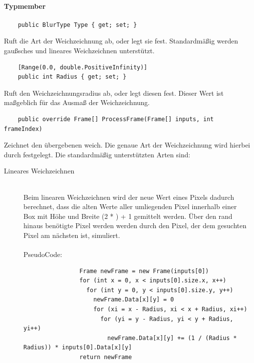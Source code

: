 \paragraph{Typmember}
\begin{itemize}

	\begin{verbatim}
	public BlurType Type { get; set; }
	\end{verbatim}
	Ruft die Art der Weichzeichnung ab, oder legt sie fest. Standardmäßig werden gaußsches und lineares Weichzeichnen unterstützt.
	
	\begin{verbatim}
	[Range(0.0, double.PositiveInfinity)]
	public int Radius { get; set; }
	\end{verbatim}
	Ruft den Weichzeichnungsradius ab, oder legt diesen fest. Dieser Wert ist maßgeblich für das Ausmaß der Weichzeichnung.

	\begin{verbatim}
	public override Frame[] ProcessFrame(Frame[] inputs, int frameIndex)
	\end{verbatim}
	Zeichnet den übergebenen  weich. Die genaue Art der Weichzeichnung wird hierbei durch  festgelegt. Die standardmäßig unterstützten Arten sind:
	\begin{description}
		\item[Lineares Weichzeichnen]~\\
			Beim linearen Weichzeichnen wird der neue Wert eines Pixels dadurch berechnet, dass die alten Werte aller umliegenden Pixel innerhalb einer Box mit Höhe und Breite (2 * ) + 1 gemittelt werden. Über den rand hinaus benötigte Pixel werden werden durch den Pixel, der dem gesuchten Pixel am nächsten ist, simuliert. ~\\~\\
			PseudoCode:
			\begin{verbatim}
				Frame newFrame = new Frame(inputs[0])
				for (int x = 0, x < inputs[0].size.x, x++)
				  for (int y = 0, y < inputs[0].size.y, y++)
				    newFrame.Data[x][y] = 0
				    for (xi = x - Radius, xi < x + Radius, xi++)
				      for (yi = y - Radius, yi < y + Radius, yi++)
				        newFrame.Data[x][y] += (1 / (Radius * Radius)) * inputs[0].Data[x][y]
				return newFrame
				

\end{verbatim}
\end{description}
\end{itemize}
